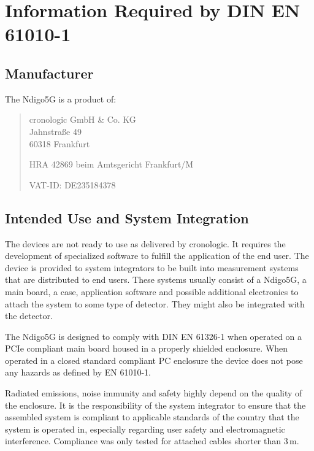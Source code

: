 \section{Information Required by DIN EN 61010-1}
\subsection{Manufacturer\label{cp:manu}}

The Ndigo5G is a product of:\

\begin{quote}
    cronologic GmbH \& Co. KG\\
    Jahnstraße 49\\
    60318 Frankfurt\par
    \noindent HRA 42869 beim Amtsgericht Frankfurt/M\par
    \noindent VAT-ID: DE235184378
\end{quote}

\subsection{Intended Use and System Integration}

    The devices are not ready to use as delivered by cronologic. It requires the development of specialized software to fulfill the application of the end user. The device is provided to system integrators to be built into measurement systems that are distributed to end users. These systems usually consist of a Ndigo5G, a main board, a case, application software and possible additional electronics to attach the system to some type of detector. They might also be integrated with the detector.\par

    The Ndigo5G is designed to comply with DIN EN 61326-1 when operated on a PCIe compliant main board housed in a properly shielded enclosure. When operated in a closed standard compliant PC enclosure the device does not pose any hazards as defined by EN 61010-1.\par

    Radiated emissions, noise immunity and safety highly depend on the quality of the enclosure. It is the responsibility of the system integrator to ensure that the assembled system is compliant to applicable standards of the country that the system is operated in, especially regarding user safety and electromagnetic interference. Compliance was only tested for attached cables shorter than 3\,m.\par

